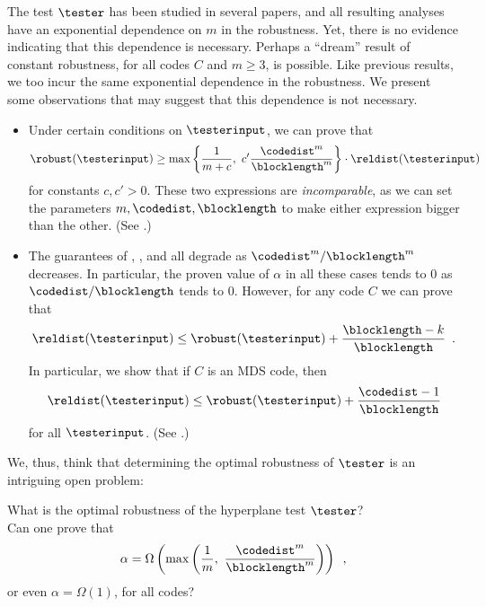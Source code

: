 \documentclass{toc}
\theoremstyle{plain}
\begin{document}
%
%


%
%
The test $\tester$ has been studied in several papers,          %
and all resulting analyses have an exponential dependence on $m$ in the robustness. Yet, there is no evidence indicating that this dependence is necessary. Perhaps a ``dream'' result of constant robustness, for all codes $C$ and $m \geq 3$, is possible. Like previous results, we too incur the same exponential dependence in the robustness. We present some observations that may suggest that this dependence is not necessary.


%
\begin{itemize}

\item Under certain conditions on $\testerinput$, we can prove that \[
    \robust(\testerinput) \geq \max\left\{\frac{1}{m + c},\ c' \frac{\codedist^m}{\blocklength^m}\right\} \cdot \reldist(\testerinput)
  \]
  for constants $c,c'>0$. These two expressions are
  \emph{incomparable}, as we can set the parameters
  $m,\codedist,\blocklength$ to make either expression bigger than the
  other. (See .)

\item The guarantees of ,
  , and 
  all degrade as ${\codedist^m}/{\blocklength^m}$ decreases. In
  particular, the proven value of $\alpha$ in all these cases tends to
  $0$ as ${\codedist}/{\blocklength}$ tends to $0$. However, for
  any code $C$ we can prove that
  \[
    \reldist(\testerinput) \leq \robust(\testerinput) + \frac{\blocklength - k}{\blocklength}\enspace.
  \]
  In particular, we show that if $C$ is an MDS code, then
  \[
    \reldist(\testerinput) \leq \robust(\testerinput) + \frac{\codedist
      - 1}{\blocklength}
  \]
  for all $\testerinput$. (See
  .)

\end{itemize}
We, thus, think that determining the optimal robustness of $\tester$ is an intriguing open problem:
\begin{center}
\begin{minipage}{0.9\textwidth}
  What is the optimal robustness of the hyperplane test $\tester$? \\ Can one prove that
  \[
    \alpha = \Omega\left(\max\left(\frac{1}{m},\ \frac{\codedist^m}{\blocklength^m}\right)\right)\enspace,
  \]
  or even $\alpha = \Omega(1)$, for all codes?
\end{minipage}
\end{center}
\end{document}
